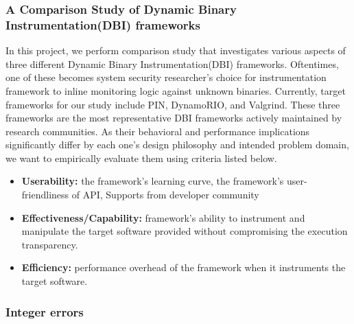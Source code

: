 \documentclass[letterpaper, 10pt]{article}
\begin{document}
\begin{small}
\subsubsection*{A Comparison Study of Dynamic Binary Instrumentation(DBI)
frameworks}
%
In this project, we perform comparison study that investigates various aspects
of three different Dynamic Binary Instrumentation(DBI) frameworks. Oftentimes,
one of these becomes system security researcher's choice for instrumentation
framework to inline monitoring logic against unknown binaries. Currently,
target frameworks for our study include PIN, DynamoRIO, and Valgrind. These
three frameworks are the most representative DBI frameworks actively maintained
by research communities. As their behavioral and performance implications
significantly differ by each one's design philosophy and intended problem
domain, we want to empirically evaluate them using criteria listed below.

\begin{itemize}
        \item {\bf Userability:} the framework's learning curve, the framework's
           user-friendliness of API, Supports from developer community
   \item {\bf Effectiveness/Capability:} framework's ability to instrument and
            manipulate the target software provided without compromising the
            execution transparency.
    \item {\bf Efficiency:} performance overhead of the framework when it instruments
    the target software.
\end{itemize}

%

\subsubsection*{Integer errors}


\end{small}
\end{document}
